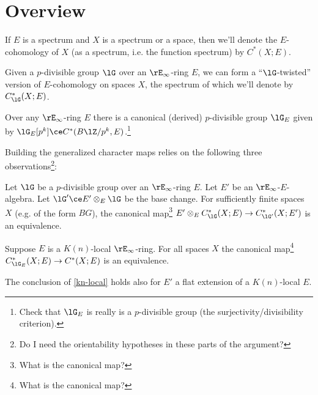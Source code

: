 \section{Overview}

\begin{notation}
  If $E$ is a spectrum and $X$ is a spectrum or a space, then we'll
  denote the $E$-cohomology of $X$ (as a spectrum, i.e. the function
  spectrum) by $C^*(X;E)$.
\end{notation}

\begin{definition}
  Given a $p$-divisible group $\lG$ over an $\rE_\infty$-ring $E$, we
  can form a ``$\lG$-twisted'' version of $E$-cohomology on spaces $X$,
  the spectrum of which we'll denote by $C_\lG^*(X;E)$.
\end{definition}

\begin{definition}
  Over any $\rE_\infty$-ring $E$ there is a canonical (derived)
  $p$-divisible group $\lG_E$ given by
  $\lG_E[p^k] \ce C^*(B\lZ/p^k, E)$.\footnote{Check that $\lG_E$ is
    really is a $p$-divisible group (the surjectivity/divisibility
    criterion).}
\end{definition}

Building the generalized character maps relies on the following three
observations\footnote{Do I need the orientability hypotheses in these
  parts of the argument?}:

\begin{theorem}
  \label{base-change}
  Let $\lG$ be a $p$-divisible group over an $\rE_\infty$-ring $E$. Let
  $E'$ be an $\rE_\infty$-$E$-algebra. Let $\lG' \ce E' \otimes_E \lG$ be
  the base change. For sufficiently finite spaces $X$ (e.g. of the
  form $BG$), the canonical map\footnote{What is the canonical map?}
  $E' \otimes_E C_\lG^*(X;E) \to C_{\lG'}^*(X;E')$ is an equivalence.
\end{theorem}

\begin{theorem}
  \label{kn-local}
  Suppose $E$ is a $K(n)$-local $\rE_\infty$-ring. For all spaces $X$
  the canonical map\footnote{What is the canonical map?}
  $C_{\lG_E}^*(X;E) \to C^*(X;E)$ is an equivalence.
\end{theorem}

\begin{corollary}
  The conclusion of \eqref{kn-local} holds also for $E'$ a flat
  extension of a $K(n)$-local $E$.
\end{corollary}

